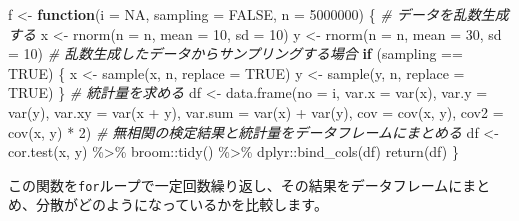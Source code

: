 \documentclass[a4paper]{tufte-handout}
\newenvironment{Shaded}{}{}
\newcommand{\AttributeTok}[1]{\textcolor[rgb]{0.49,0.56,0.16}{#1}}
\newcommand{\CommentTok}[1]{\textcolor[rgb]{0.38,0.63,0.69}{\textit{#1}}}
\newcommand{\ConstantTok}[1]{\textcolor[rgb]{0.53,0.00,0.00}{#1}}
\newcommand{\ControlFlowTok}[1]{\textcolor[rgb]{0.00,0.44,0.13}{\textbf{#1}}}
\newcommand{\DecValTok}[1]{\textcolor[rgb]{0.25,0.63,0.44}{#1}}
\newcommand{\FunctionTok}[1]{\textcolor[rgb]{0.02,0.16,0.49}{#1}}
\newcommand{\NormalTok}[1]{#1}
\newcommand{\OtherTok}[1]{\textcolor[rgb]{0.00,0.44,0.13}{#1}}
\newcommand{\SpecialCharTok}[1]{\textcolor[rgb]{0.25,0.44,0.63}{#1}}
\begin{document}
\begin{Shaded}
\begin{Highlighting}[numbers=left,,]
\NormalTok{f }\OtherTok{\textless{}{-}} \ControlFlowTok{function}\NormalTok{(}\AttributeTok{i =} \ConstantTok{NA}\NormalTok{, }\AttributeTok{sampling =} \ConstantTok{FALSE}\NormalTok{, }\AttributeTok{n =} \DecValTok{5000000}\NormalTok{) \{}
  \CommentTok{\# データを乱数生成する}
\NormalTok{  x }\OtherTok{\textless{}{-}} \FunctionTok{rnorm}\NormalTok{(}\AttributeTok{n =}\NormalTok{ n, }\AttributeTok{mean =} \DecValTok{10}\NormalTok{, }\AttributeTok{sd =} \DecValTok{10}\NormalTok{)}
\NormalTok{  y }\OtherTok{\textless{}{-}} \FunctionTok{rnorm}\NormalTok{(}\AttributeTok{n =}\NormalTok{ n, }\AttributeTok{mean =} \DecValTok{30}\NormalTok{, }\AttributeTok{sd =} \DecValTok{10}\NormalTok{)}
  \CommentTok{\# 乱数生成したデータからサンプリングする場合}
  \ControlFlowTok{if}\NormalTok{ (sampling }\SpecialCharTok{==} \ConstantTok{TRUE}\NormalTok{) \{}
\NormalTok{    x }\OtherTok{\textless{}{-}} \FunctionTok{sample}\NormalTok{(x, n, }\AttributeTok{replace =} \ConstantTok{TRUE}\NormalTok{)}
\NormalTok{    y }\OtherTok{\textless{}{-}} \FunctionTok{sample}\NormalTok{(y, n, }\AttributeTok{replace =} \ConstantTok{TRUE}\NormalTok{)}
\NormalTok{  \}}
  \CommentTok{\# 統計量を求める}
\NormalTok{  df }\OtherTok{\textless{}{-}} \FunctionTok{data.frame}\NormalTok{(}\AttributeTok{no =}\NormalTok{ i, }\AttributeTok{var.x =} \FunctionTok{var}\NormalTok{(x), }\AttributeTok{var.y =} \FunctionTok{var}\NormalTok{(y),}
                   \AttributeTok{var.xy =} \FunctionTok{var}\NormalTok{(x }\SpecialCharTok{+}\NormalTok{ y), }\AttributeTok{var.sum =} \FunctionTok{var}\NormalTok{(x) }\SpecialCharTok{+} \FunctionTok{var}\NormalTok{(y),}
                   \AttributeTok{cov =} \FunctionTok{cov}\NormalTok{(x, y), }\AttributeTok{cov2 =} \FunctionTok{cov}\NormalTok{(x, y) }\SpecialCharTok{*} \DecValTok{2}\NormalTok{)}
  \CommentTok{\# 無相関の検定結果と統計量をデータフレームにまとめる}
\NormalTok{  df }\OtherTok{\textless{}{-}} \FunctionTok{cor.test}\NormalTok{(x, y) }\SpecialCharTok{\%\textgreater{}\%}\NormalTok{ broom}\SpecialCharTok{::}\FunctionTok{tidy}\NormalTok{() }\SpecialCharTok{\%\textgreater{}\%}\NormalTok{ dplyr}\SpecialCharTok{::}\FunctionTok{bind\_cols}\NormalTok{(df)}
  \FunctionTok{return}\NormalTok{(df)}
\NormalTok{\}}
\end{Highlighting}
\end{Shaded}

この関数を\texttt{for}ループで一定回数繰り返し、その結果をデータフレームにまとめ、分散がどのようになっているかを比較します。
\end{document}
